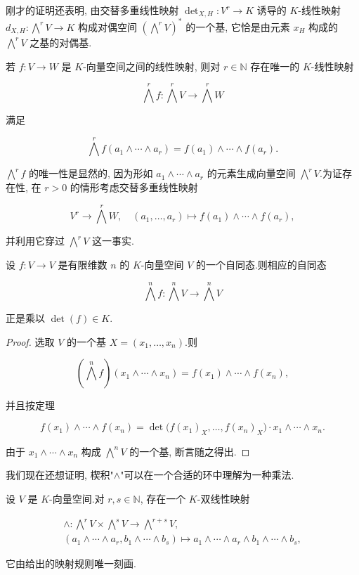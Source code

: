刚才的证明还表明, 由交替多重线性映射 $\det_{X, H} \colon V^r \to K$ 诱导的 $K$-线性映射 $d_{X, H} \colon \bigwedge^r V \to K$ 构成对偶空间 $(\bigwedge^r V)^*$ 的一个基, 它恰是由元素 $x_H$ 构成的 $\bigwedge^r V$ 之基的对偶基.

若 $f \colon V \longrightarrow W$ 是 $K$-向量空间之间的线性映射, 则对 $r \in \mathbb{N}$ 存在唯一的 $K$-线性映射

\[
\bigwedge^r f \colon \bigwedge^r V \longrightarrow \bigwedge^r W
\]

满足

\[
\bigwedge^r f(a_1 \wedge \cdots \wedge a_r) = f(a_1) \wedge \cdots \wedge f(a_r).
\]

$\bigwedge^r f$ 的唯一性是显然的, 因为形如 $a_1 \wedge \cdots \wedge a_r$ 的元素生成向量空间 $\bigwedge^r V$.为证存在性, 在 $r > 0$ 的情形考虑交替多重线性映射

\[
V^r \longrightarrow \bigwedge^r W, \quad (a_1, \ldots, a_r) \longmapsto f(a_1) \wedge \cdots \wedge f(a_r),
\]

并利用它穿过 $\bigwedge^r V$ 这一事实.

\begin{corollary}\label{cor:4.5.5}
设 $f \colon V \longrightarrow V$ 是有限维数 $n$ 的 $K$-向量空间 $V$ 的一个自同态.则相应的自同态

\[
\bigwedge^n f \colon \bigwedge^n V \longrightarrow \bigwedge^n V
\]

正是乘以 $\det(f) \in K$.
\end{corollary}

\begin{proof}
选取 $V$ 的一个基 $X = (x_1, \ldots, x_n)$.则

\[
\left(\bigwedge^n f\right)(x_1 \wedge \cdots \wedge x_n) = f(x_1) \wedge \cdots \wedge f(x_n),
\]

并且按定理~

\[
f(x_1) \wedge \cdots \wedge f(x_n) = \det\big(f(x_1)_X, \ldots, f(x_n)_X\big) \cdot x_1 \wedge \cdots \wedge x_n.
\]

由于 $x_1 \wedge \cdots \wedge x_n$ 构成 $\bigwedge^n V$ 的一个基, 断言随之得出.
\end{proof}

我们现在还想证明, 楔积"$\wedge$"可以在一个合适的环中理解为一种乘法.

\begin{lemma}\label{lem:4.5.6}
设 $V$ 是 $K$-向量空间.对 $r, s \in \mathbb{N}$, 存在一个 $K$-双线性映射

\[
\begin{array}{c}
\wedge \colon \bigwedge^r V \times \bigwedge^s V \longrightarrow \bigwedge^{r + s} V, \\
(a_1 \wedge \cdots \wedge a_r, b_1 \wedge \cdots \wedge b_s) \longmapsto a_1 \wedge \cdots \wedge a_r \wedge b_1 \wedge \cdots \wedge b_s,
\end{array}
\]

它由给出的映射规则唯一刻画.
\end{lemma}

